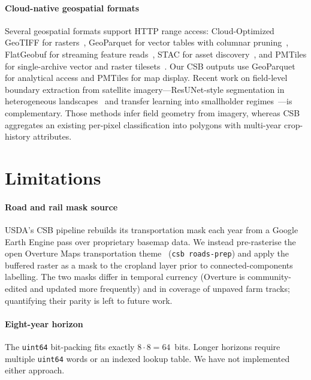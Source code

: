 \documentclass[preprint,12pt]{elsarticle}
\begin{document}
\paragraph{Cloud-native geospatial formats}
Several geospatial formats support HTTP range access: Cloud-Optimized
GeoTIFF for rasters~\cite{ogc_cog}, GeoParquet for vector tables with
columnar pruning~\cite{geoparquet,kelsey2023geoparquet}, FlatGeobuf for
streaming feature reads~\cite{flatgeobuf}, STAC for asset
discovery~\cite{stacspec}, and PMTiles for single-archive vector and
raster tilesets~\cite{pmtiles}. Our CSB outputs use GeoParquet for
analytical access and PMTiles for map display. Recent work on field-level
boundary extraction from satellite imagery---ResUNet-style segmentation
in heterogeneous landscapes~\cite{waldner2020deepedge} and transfer
learning into smallholder regimes~\cite{wang2022smallholder}---is
complementary. Those methods infer field geometry from imagery, whereas CSB
aggregates an existing per-pixel classification into polygons with
multi-year crop-history attributes.

\section{Limitations}
\label{sec:limits}

\paragraph{Road and rail mask source} USDA's CSB pipeline rebuilds
its transportation mask each year from a Google Earth Engine pass over
proprietary basemap data. We instead pre-rasterise the open Overture
Maps transportation theme~\cite{overture} (\texttt{csb roads-prep}) and
apply the buffered raster as a mask to the cropland layer prior to
connected-components labelling. The two masks differ in temporal
currency (Overture is community-edited and updated more frequently)
and in coverage of unpaved farm tracks; quantifying their parity is
left to future work.

\paragraph{Eight-year horizon} The \texttt{uint64} bit-packing fits exactly
$8 \cdot 8 = 64$~bits. Longer horizons require multiple \texttt{uint64}
words or an indexed lookup table. We have not implemented either approach.
\end{document}
